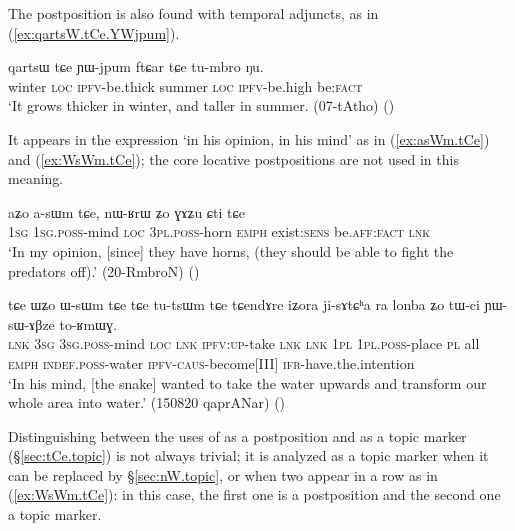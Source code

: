 The postposition  is also found with temporal adjuncts, as in (\ref{ex:qartsW.tCe.YWjpum}).

\begin{exe}
\ex \label{ex:qartsW.tCe.YWjpum}
\gll qartsɯ tɕe ɲɯ-jpum ftɕar tɕe tu-mbro ŋu. \\
winter \textsc{loc} \textsc{ipfv}-be.thick summer \textsc{loc} \textsc{ipfv}-be.high be:\textsc{fact} \\
\glt `It grows thicker in winter, and taller in summer. (07-tAtho) ()
\end{exe}

It appears in the expression  `in his opinion, in his mind' as in (\ref{ex:asWm.tCe}) and (\ref{ex:WsWm.tCe}); the core locative postpositions are not used in this meaning.

\begin{exe}
\ex \label{ex:asWm.tCe}
\gll aʑo a-sɯm tɕe, nɯ-ʁrɯ ʑo ɣɤʑu ɕti tɕe \\
\textsc{1sg} \textsc{1sg}.\textsc{poss}-mind \textsc{loc} \textsc{3pl}.\textsc{poss}-horn \textsc{emph} exist:\textsc{sens} be.\textsc{aff}:\textsc{fact} \textsc{lnk} \\
\glt `In my opinion, [since] they have horns, (they should be able to fight the predators off).' (20-RmbroN)
()
\end{exe}


\begin{exe}
\ex \label{ex:WsWm.tCe}
\gll tɕe ɯʑo ɯ-sɯm tɕe tɕe tu-tsɯm tɕe tɕendɤre iʑora ji-sɤtɕʰa ra lonba ʑo tɯ-ci ɲɯ-sɯ-ɤβze to-ʁmɯɣ. \\
\textsc{lnk} \textsc{3sg} \textsc{3sg}.\textsc{poss}-mind \textsc{loc} \textsc{lnk} \textsc{ipfv}:\textsc{up}-take \textsc{lnk} \textsc{lnk} \textsc{1pl} \textsc{1pl}.\textsc{poss}-place \textsc{pl} all \textsc{emph} \textsc{indef}.\textsc{poss}-water \textsc{ipfv}-\textsc{caus}-become[III] \textsc{ifr}-have.the.intention \\
\glt `In his mind, [the snake] wanted to take the water upwards and transform our whole area into water.' (150820 qaprANar)
()
\end{exe} 

Distinguishing between the uses of  as a postposition and as a topic marker (§\ref{sec:tCe.topic}) is not always trivial; it is analyzed as a topic marker when it can be replaced by  §\ref{sec:nW.topic}, or when two  appear in a row as in (\ref{ex:WsWm.tCe}): in this case, the first one is a postposition and the second one a topic marker.


